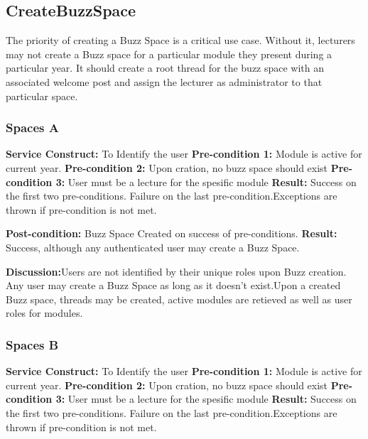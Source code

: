 
\subsection{CreateBuzzSpace}
The priority of creating a Buzz Space is a critical use case. Without it, lecturers may not create a Buzz space for a particular module they present during a particular year. It should create a root thread for the buzz space with an associated welcome post and assign the lecturer as administrator to that particular space.

\subsubsection{Spaces A}
\textbf{Service Construct:}  To Identify the user \newline
\textbf{Pre-condition 1:}  Module is active for current year.  \newline
\textbf{Pre-condition 2:}  Upon cration, no buzz space should exist \newline
\textbf{Pre-condition 3:}  User must be a lecture for the spesific module \newline
\textbf{Result:} Success on the first two  pre-conditions. Failure on the last pre-condition.Exceptions are thrown if pre-condition is not met.\newline

\textbf{Post-condition:} Buzz Space Created on success of pre-conditions. \newline
\textbf{Result:} Success, although any authenticated user may create a Buzz Space.\newline
  
\textbf{Discussion:}Users are not identified by their unique roles upon Buzz creation. Any user may create a Buzz Space as long as it doesn't exist.Upon a created Buzz space, threads may be created, active modules are retieved as well as user roles for modules. 

\subsubsection{Spaces B}
\textbf{Service Construct:} To Identify the user \newline
\textbf{Pre-condition 1:}  Module is active for current year.  \newline
\textbf{Pre-condition 2:}  Upon cration, no buzz space should exist \newline
\textbf{Pre-condition 3:}  User must be a lecture for the spesific module \newline
\textbf{Result:} Success on the first two  pre-conditions. Failure on the last pre-condition.Exceptions are thrown if pre-condition is not met. \newline

